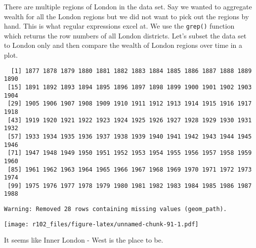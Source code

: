 \documentclass[]{article}
\newenvironment{Shaded}{\begin{snugshade}}{\end{snugshade}}
\newcommand{\DataTypeTok}[1]{\textcolor[rgb]{0.13,0.29,0.53}{#1}}
\newcommand{\KeywordTok}[1]{\textcolor[rgb]{0.13,0.29,0.53}{\textbf{#1}}}
\newcommand{\NormalTok}[1]{#1}
\newcommand{\OperatorTok}[1]{\textcolor[rgb]{0.81,0.36,0.00}{\textbf{#1}}}
\newcommand{\OtherTok}[1]{\textcolor[rgb]{0.56,0.35,0.01}{#1}}
\newcommand{\StringTok}[1]{\textcolor[rgb]{0.31,0.60,0.02}{#1}}
\begin{document}
There are multiple regions of London in the data set. Say we wanted to aggregate wealth for all the London regions but we did not want to pick out the regions by hand. This is what regular expressions excel at. We use the \texttt{grep()} function which returns the row numbers of all London districts. Let's subset the data set to London only and then compare the wealth of London regions over time in a plot.

\begin{Shaded}
\end{Shaded}

\begin{verbatim}
  [1] 1877 1878 1879 1880 1881 1882 1883 1884 1885 1886 1887 1888 1889 1890
 [15] 1891 1892 1893 1894 1895 1896 1897 1898 1899 1900 1901 1902 1903 1904
 [29] 1905 1906 1907 1908 1909 1910 1911 1912 1913 1914 1915 1916 1917 1918
 [43] 1919 1920 1921 1922 1923 1924 1925 1926 1927 1928 1929 1930 1931 1932
 [57] 1933 1934 1935 1936 1937 1938 1939 1940 1941 1942 1943 1944 1945 1946
 [71] 1947 1948 1949 1950 1951 1952 1953 1954 1955 1956 1957 1958 1959 1960
 [85] 1961 1962 1963 1964 1965 1966 1967 1968 1969 1970 1971 1972 1973 1974
 [99] 1975 1976 1977 1978 1979 1980 1981 1982 1983 1984 1985 1986 1987 1988
\end{verbatim}

\begin{Shaded}
\end{Shaded}

\begin{verbatim}
Warning: Removed 28 rows containing missing values (geom_path).
\end{verbatim}

\texttt{[image: r102\_files/figure-latex/unnamed-chunk-91-1.pdf]}

It seems like Inner London - West is the place to be.
\end{document}
